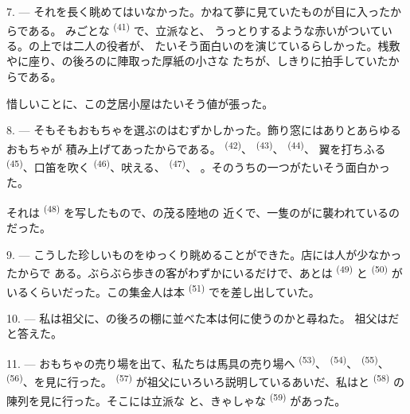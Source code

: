 7. --- それを長く眺めてはいなかった。かねて夢に見ていたものが目に入ったからである。
みごとな \textsuperscript{(41)} で、立派なと、
うっとりするような赤いがついている。の上では二人の役者が、
たいそう面白いのを演じているらしかった。桟敷やに座り、の後ろのに陣取った厚紙の小さな
たちが、しきりに拍手していたからである。

惜しいことに、この芝居小屋はたいそう値が張った。

8. --- そもそもおもちゃを選ぶのはむずかしかった。飾り窓にはありとあらゆるおもちゃが
積み上げてあったからである。 \textsuperscript{(42)}、
 \textsuperscript{(43)}、 \textsuperscript{(44)}、
翼を打ちふる \textsuperscript{(45)}、口笛を吹く
\textsuperscript{(46)}、吠える、 \textsuperscript{(47)}、
。そのうちの一つがたいそう面白かった。


それは \textsuperscript{(48)} を写したもので、の茂る陸地の
近くで、一隻のがに襲われているのだった。

9. --- こうした珍しいものをゆっくり眺めることができた。店には人が少なかったからで
ある。ぶらぶら歩きの客がわずかにいるだけで、あとは \textsuperscript{(49)}
と \textsuperscript{(50)} がいるくらいだった。この集金人は本
 \textsuperscript{(51)} でを差し出していた。

10. --- 私は祖父に、の後ろの棚に並べた本は何に使うのかと尋ねた。
祖父はだと答えた。

\VUsaut{3.6mm}
\VUsaut{2.8mm}

11. --- おもちゃの売り場を出て、私たちは馬具の売り場へ \textsuperscript{(53)}、
 \textsuperscript{(54)}、 \textsuperscript{(55)}、
 \textsuperscript{(56)}、を見に行った。
\textsuperscript{(57)} が祖父にいろいろ説明しているあいだ、私はと
 \textsuperscript{(58)} の陳列を見に行った。そこには立派な
と、きゃしゃな \textsuperscript{(59)} があった。

